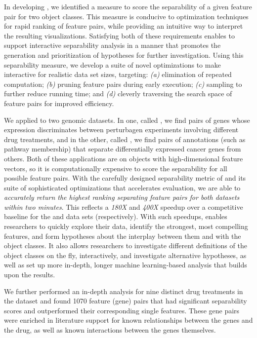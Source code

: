In developing \genviz,
we identified a measure to score the separability
of a given feature pair for two object classes.
This measure is conducive to
optimization techniques for rapid ranking of feature
pairs, while providing an intuitive way
to interpret
the resulting visualizations.
Satisfying both of these requirements
enables \genviz to support interactive separability analysis
in a manner that promotes the generation and prioritization
of hypotheses for further investigation.
Using this separability measure, we develop a suite of novel
optimizations to make \genviz interactive for realistic data set sizes,
targeting: {\em (a)} elimination of repeated computation;
{\em (b)} pruning feature pairs during early execution;
{\em (c)} sampling to further reduce running time;
and {\em (d)} cleverly traversing the search space
of feature pairs for improved efficiency.

We applied \genviz to two genomic datasets.
In one, called \lincs, we find pairs of genes
whose expression discriminates between perturbagen experiments
involving different drug treatments, and in the other, called \msig,
we find pairs of annotations (such as pathway membership)
that separate differentially expressed
cancer genes from others.
Both of these applications are on
objects with high-dimensional feature vectors,
so it is computationally expensive to score the separability
for all possible feature pairs.
With the carefully designed
separability metric of \genviz and its suite of sophisticated optimizations
that accelerates evaluation,
we are able to {\emph{accurately return the
highest ranking separating
feature pairs for both datasets within two minutes}}.
This reflects a \emph{180X} and \emph{400X} speedup
over a competitive baseline for the \msig and \lincs data sets (respectively).
With such speedups, \genviz enables researchers to quickly explore their data,
identify the strongest, most compelling features,
and form hypotheses about the interplay between them and with the object classes.
It also allows researchers to investigate different definitions
of the object classes on the fly, interactively,
and investigate alternative hypotheses,
as well as set up more in-depth,
longer machine learning-based analysis
that builds upon the \genviz results.

We further performed an in-depth analysis
for nine distinct drug treatments in the \lincs dataset and
found 1070 feature (gene) pairs that had significant separability scores and outperformed
their corresponding single features. These gene pairs were enriched
in literature support for known relationships between the genes and the drug,
as well as known interactions between the genes themselves.

